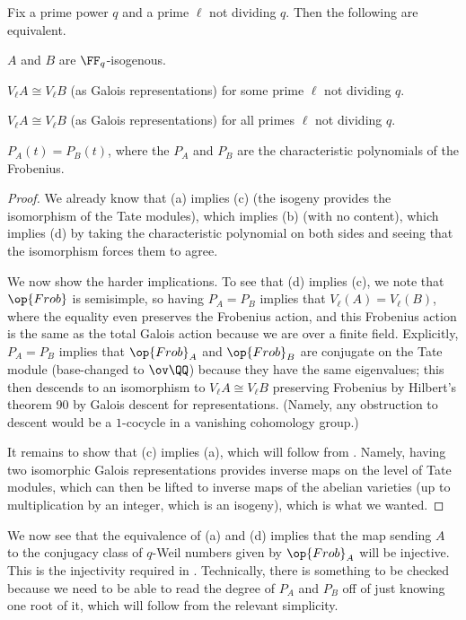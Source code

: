 \documentclass[../notes.tex]{subfiles}
\begin{document}
\begin{corollary}
	Fix a prime power $q$ and a prime $\ell$ not dividing $q$. Then the following are equivalent.
	\begin{listalph}
		\item $A$ and $B$ are $\FF_q$-isogenous.
		\item $V_\ell A\cong V_\ell B$ (as Galois representations) for some prime $\ell$ not dividing $q$.
		\item $V_\ell A\cong V_\ell B$ (as Galois representations) for all primes $\ell$ not dividing $q$.
		\item $P_A(t)=P_B(t)$, where the $P_A$ and $P_B$ are the characteristic polynomials of the Frobenius.
	\end{listalph}
\end{corollary}
\begin{proof}
	We already know that (a) implies (c) (the isogeny provides the isomorphism of the Tate modules), which implies (b) (with no content), which implies (d) by taking the characteristic polynomial on both sides and seeing that the isomorphism forces them to agree.

	We now show the harder implications. To see that (d) implies (c), we note that $\op{Frob}$ is semisimple, so having $P_A=P_B$ implies that $V_\ell(A)=V_\ell(B)$, where the equality even preserves the Frobenius action, and this Frobenius action is the same as the total Galois action because we are over a finite field. Explicitly, $P_A=P_B$ implies that $\op{Frob}_A$ and $\op{Frob}_B$ are conjugate on the Tate module (base-changed to $\ov\QQ$) because they have the same eigenvalues; this then descends to an isomorphism to $V_\ell A\cong V_\ell B$ preserving Frobenius by Hilbert's theorem 90 by Galois descent for representations. (Namely, any obstruction to descent would be a $1$-cocycle in a vanishing cohomology group.)

	It remains to show that (c) implies (a), which will follow from . Namely, having two isomorphic Galois representations provides inverse maps on the level of Tate modules, which can then be lifted to inverse maps of the abelian varieties (up to multiplication by an integer, which is an isogeny), which is what we wanted.
\end{proof}
We now see that the equivalence of (a) and (d) implies that the map sending $A$ to the conjugacy class of $q$-Weil numbers given by $\op{Frob}_A$ will be injective. This is the injectivity required in . Technically, there is something to be checked because we need to be able to read the degree of $P_A$ and $P_B$ off of just knowing one root of it, which will follow from the relevant simplicity.
\end{document}
